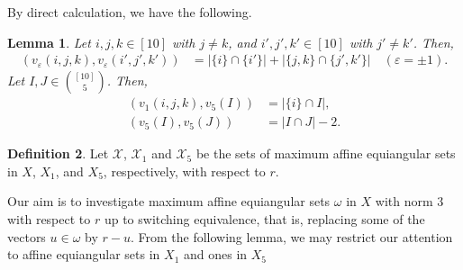 \documentclass[reqno, 11pt]{amsart}
\numberwithin{equation}{section}
\newtheorem{lem}{Lemma}[section]
\theoremstyle{definition}
\newtheorem{dfn}[lem]{Definition}%
\newcommand{\aes}{\omega}
\newcommand{\cX}{\mathcal{X}}
\newcommand{\sr}{ r } %
\begin{document}
By direct calculation, we have the following.
\begin{lem} \label{lem:inner prod}
	Let $i,j,k \in [10]$ with $j \neq k$, and  $i',j',k' \in [10]$ with $j' \neq k'$.
	Then,
	\begin{align}
		(v_{\varepsilon}(i,j,k), v_{\varepsilon}(i',j',k')) & =
		|\{i\} \cap \{i'\} | + | \{j,k\} \cap \{j',k'\} |\quad(\varepsilon=\pm 1). \label{lem:inner prod:1}
	\end{align}
	Let $I,J \in \binom{[10]}{5}$. Then,
	\begin{align}
		(v_{ 1}(i,j,k), v_5(I)) & =  | \{i\} \cap I |,\label{lem:inner prod:2} \\
		(v_5(I),v_5(J))         & = | I \cap J|-2.\label{lem:inner prod:3}
	\end{align}
\end{lem}

\begin{dfn}
	Let $\cX$, $\cX_{1}$ and $\cX_5$ be the sets of maximum affine equiangular sets in $X$,
	$X_{1}$,
	and $X_5$, respectively, with respect to $\sr$.
\end{dfn}

Our aim is to investigate maximum affine equiangular sets $\aes$ in $X$ with norm $3$ with respect to $\sr$
up to switching equivalence, that is, replacing some of the vectors $u \in \aes$
by $\sr-u$.
From the following lemma,
we may restrict our attention to affine equiangular sets in $X_1$ and ones in $X_5$
\end{document}
